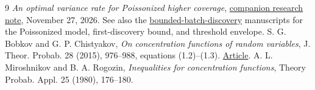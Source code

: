 \documentclass[11pt]{article}
\numberwithin{equation}{section}
\begin{document}
\begin{thebibliography}{9}
 \emph{An optimal variance rate for Poissonized higher coverage},
\href{https://github.com/long-mathematics/bounded-batch-discovery/blob/main/papers/higher_coverage.pdf}{companion research note}, November 27, 2026. See also the
\href{https://github.com/long-mathematics/bounded-batch-discovery}{bounded-batch-discovery}
manuscripts for the Poissonized model, first-discovery bound, and threshold envelope.
 S. G. Bobkov and G. P. Chistyakov, \emph{On concentration functions of random
variables}, J. Theor. Probab. 28 (2015), 976--988, equations (1.2)--(1.3).
\href{https://www-users.cse.umn.edu/~bobko001/papers/2015_JOTP_BC_Conc.functions.authors.03.07.2013.pdf}{Article}.
 A. L. Miroshnikov and B. A. Rogozin, \emph{Inequalities for concentration
functions}, Theory Probab. Appl. 25 (1980), 176--180.
\end{thebibliography}
\end{document}
